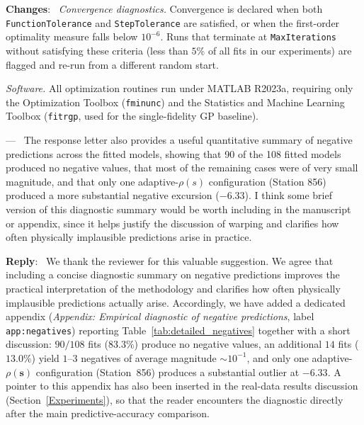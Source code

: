 \documentclass[12pt]{article}
\newcommand{\0}{\mathbf{0}}
\newcounter{reviewer}
\newcounter{point}[reviewer]
\renewcommand{\thepoint}{P\,\thereviewer.\arabic{point}}
\newenvironment{point}
   {\refstepcounter{point} \bigskip \noindent {\textbf{Point~\thepoint} } ---\ }
   {\par }
\newenvironment{reply}
   {\medskip \noindent \begin{sf}\color{Blue}\textbf{Reply}:\  }
   {\medskip \end{sf}}
\newenvironment{changes}
   {\medskip \noindent \begin{sf}\color{ForestGreen}\textbf{Changes}:\  }
   {\medskip \end{sf}}
\begin{document}
\begin{changes}
\smallskip
\noindent\textit{Convergence diagnostics.} Convergence is declared when both \texttt{FunctionTolerance} and \texttt{StepTolerance} are satisfied, or when the first-order optimality measure falls below $10^{-6}$. Runs that terminate at \texttt{MaxIterations} without satisfying these criteria (less than $5\%$ of all fits in our experiments) are flagged and re-run from a different random start.

\smallskip
\noindent\textit{Software.} All optimization routines run under MATLAB R2023a, requiring only the Optimization Toolbox (\texttt{fminunc}) and the Statistics and Machine Learning Toolbox (\texttt{fitrgp}, used for the single-fidelity GP baseline).
\end{changes}


\begin{point}
The response letter also provides a useful quantitative summary of negative predictions across the fitted models, showing that 90 of the 108 fitted models produced no negative values, that most of the remaining cases were of very small magnitude, and that only one adaptive-$\rho(s)$ configuration (Station 856) produced a more substantial negative excursion ($-6.33$). I think some brief version of this diagnostic summary would be worth including in the manuscript or appendix, since it helps justify the discussion of warping and clarifies how often physically implausible predictions arise in practice.
\end{point}

\begin{reply}
We thank the reviewer for this valuable suggestion. We agree that including a concise diagnostic summary on negative predictions improves the practical interpretation of the methodology and clarifies how often physically implausible predictions actually arise. Accordingly, we have added a dedicated appendix (\emph{Appendix: Empirical diagnostic of negative predictions}, label \texttt{app:negatives}) reporting Table~\ref{tab:detailed_negatives} together with a short discussion: $90/108$ fits ($83.3\%$) produce no negative values, an additional $14$ fits ($13.0\%$) yield $1$--$3$ negatives of average magnitude $\sim 10^{-1}$, and only one adaptive-$\rho(\bm{s})$ configuration (Station~856) produces a substantial outlier at $-6.33$. A pointer to this appendix has also been inserted in the real-data results discussion (Section~\ref{Experiments}), so that the reader encounters the diagnostic directly after the main predictive-accuracy comparison.
\end{reply}
\end{document}
